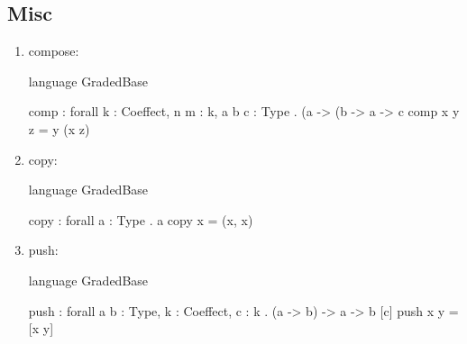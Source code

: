 \subsection{Misc}
\begin{enumerate}
\item compose: 
\begin{granule}
language GradedBase

comp : forall {k : Coeffect, n m : k, a b c : Type} 
     . (a %
     -> (b %
     -> a %
     -> c
comp x y z = y (x z)
\end{granule}
\item copy: 
\begin{granule}
language GradedBase

copy : forall { a : Type } . a %
copy x = (x, x)
\end{granule}
\item push:
\begin{granule}
language GradedBase

push : forall { a b : Type, k : Coeffect, c : k } 
     . (a -> b) %
     -> a %
     -> b [c]
push x y = [x y]
\end{granule}
\end{enumerate}